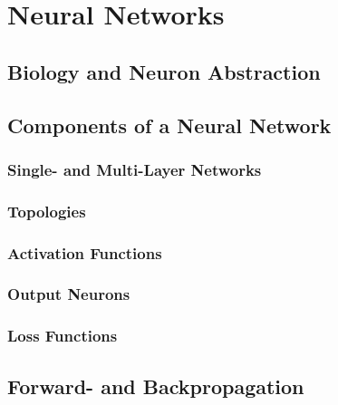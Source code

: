 	\section{Neural Networks} %

		\subsection{Biology and Neuron Abstraction} %

		\subsection{Components of a Neural Network} %

			\subsubsection{Single- and Multi-Layer Networks} %

			\subsubsection{Topologies} %

			\subsubsection{Activation Functions} %

			\subsubsection{Output Neurons} %

			\subsubsection{Loss Functions} %

		\subsection{Forward- and Backpropagation} %

